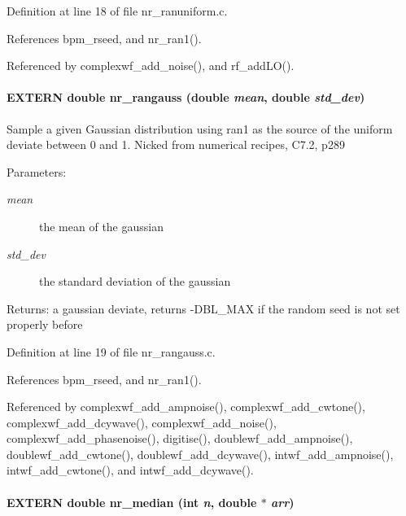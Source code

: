 Definition at line 18 of file nr\_\-ranuniform.c.

References bpm\_\-rseed, and nr\_\-ran1().

Referenced by complexwf\_\-add\_\-noise(), and rf\_\-addLO().
\paragraph[nr\_\-rangauss]{\setlength{\rightskip}{0pt plus 5cm}EXTERN double nr\_\-rangauss (double {\em mean}, \/  double {\em std\_\-dev})}\hfill\label{group__nr_g93bd46f8b07819fa96077b0c12efa6a0}


Sample a given Gaussian distribution using ran1 as the source of the uniform deviate between 0 and 1. Nicked from numerical recipes, C7.2, p289

\begin{Desc}
\item[Parameters:]
\begin{description}
\item[{\em mean}]the mean of the gaussian \item[{\em std\_\-dev}]the standard deviation of the gaussian\end{description}
\end{Desc}
\begin{Desc}
\item[Returns:]a gaussian deviate, returns -DBL\_\-MAX if the random seed is not set properly before \end{Desc}


Definition at line 19 of file nr\_\-rangauss.c.

References bpm\_\-rseed, and nr\_\-ran1().

Referenced by complexwf\_\-add\_\-ampnoise(), complexwf\_\-add\_\-cwtone(), complexwf\_\-add\_\-dcywave(), complexwf\_\-add\_\-noise(), complexwf\_\-add\_\-phasenoise(), digitise(), doublewf\_\-add\_\-ampnoise(), doublewf\_\-add\_\-cwtone(), doublewf\_\-add\_\-dcywave(), intwf\_\-add\_\-ampnoise(), intwf\_\-add\_\-cwtone(), and intwf\_\-add\_\-dcywave().
\paragraph[nr\_\-median]{\setlength{\rightskip}{0pt plus 5cm}EXTERN double nr\_\-median (int {\em n}, \/  double $\ast$ {\em arr})}\hfill\label{group__nr_g782a7127ec2e949ffd8081fb7863d517}


